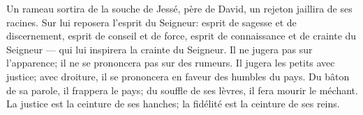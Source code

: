 Un rameau sortira de la souche de Jessé, père de David,
	un rejeton jaillira de ses racines.
Sur lui reposera l’esprit du Seigneur:
	esprit de sagesse et de discernement,
	esprit de conseil et de force,
	esprit de connaissance et de crainte du Seigneur
	--- qui lui inspirera la crainte du Seigneur.
Il ne jugera pas sur l’apparence;
	il ne se prononcera pas sur des rumeurs.
Il jugera les petits avec justice;
	avec droiture, il se prononcera en faveur des humbles du pays.
Du bâton de sa parole, il frappera le pays;
	du souffle de ses lèvres, il fera mourir le méchant.
La justice est la ceinture de ses hanches;
	la fidélité est la ceinture de ses reins.

